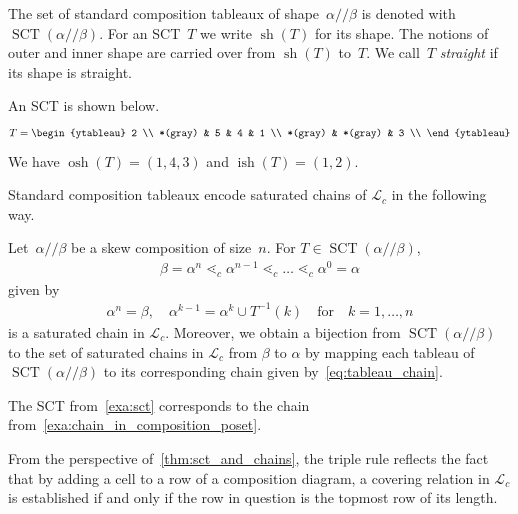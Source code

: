 \documentclass[ALCO,ThmDefs,Unicode,epreuves]{cedram}
\newcommand{\mc}[1]{\mathcal{#1} }
\DeclareMathOperator{\SCT}{SCT}
\DeclareMathOperator{\sh}{sh}
\DeclareMathOperator{\osh}{osh}
\DeclareMathOperator{\ish}{ish}
\newcommand{\ab}{{\alpha / \! \! / \beta}}
\begin{document}
The set of standard composition tableaux of shape~$\ab$ is denoted with $\SCT(\ab)$. 
For an SCT~$T$ we write $\sh(T)$ for its shape. 
The notions of outer and inner shape are carried over from $\sh(T)$ to~$T$.
We call~$T$ \emph{straight} if its shape is straight.

\begin{exam}
	\label{exa:sct}
	 An SCT is shown below.
	\begin{align*}
	T = 
	\begin{ytableau} 
		2 \\ 
		*(gray) & 5 & 4 & 1 \\ 
		*(gray) & *(gray) & 3 \\ 
		\end{ytableau}
	\end{align*}
	We have $\osh(T)= (1,4,3)$ and 	$\ish(T) = (1,2)$.
\end{exam}

Standard composition tableaux encode saturated chains of $\mathcal{L}_c$ in the following way.

\begin{prop}
	\label{thm:sct_and_chains}
	Let~$\ab$ be a skew composition of size~$n$. For $T\in \SCT(\ab)$, 
	\begin{align*}
		\beta = \alpha^n \lessdot_c \alpha^{n-1} \lessdot_c \dots \lessdot_c \alpha^0 =\alpha
	\end{align*}
	given by
	\begin{align} \label{eq:tableau_chain}
	\alpha^n = \beta, \quad \alpha^{k-1} = \alpha^k \cup T^{-1}(k) \quad \text{for} \quad k= 1,\dots, n
	\end{align}
	is a saturated chain in $\mathcal{L}_c$. Moreover, we obtain a bijection from $\SCT(\ab)$ to the set of saturated chains in $\mathcal{L}_c$ from $\beta$ to $\alpha$ by mapping each tableau of $\SCT(\ab)$ to its corresponding chain given by~\eqref{eq:tableau_chain}. 	 
\end{prop}

\begin{exam}
	The SCT from~\cref{exa:sct} 	corresponds to the chain from~\cref{exa:chain_in_composition_poset}.	
\end{exam}

From the perspective of~\cref{thm:sct_and_chains}, the triple rule reflects the fact that by adding a cell to a row of a composition diagram, a covering relation in $\mc L_c$ is established if and only if the row in question is the topmost row of its length.
\end{document}

